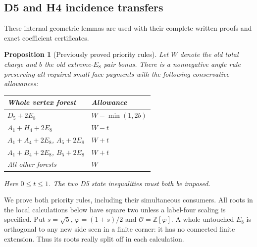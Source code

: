 \documentclass[11pt]{article}
\newtheorem{proposition}[theorem]{Proposition}
\begin{document}
\subsection{D5 and H4 incidence transfers}
These internal geometric lemmas are used with their complete written
proofs and exact coefficient certificates.
\begin{proposition}[Previously proved priority rules]\label{prop:priority}
Let $W$ denote the old total charge and $b$ the old extreme-$E_8$ pair
bonus. There is a nonnegative angle rule preserving all required
small-face payments with the following conservative allowances:
\begin{center}
\begin{tabular}{ll}\toprule
Whole vertex forest&Allowance\\\midrule
$D_5+2E_8$&$W-\min(1,2b)$\\
$A_1+H_4+2E_8$&$W-t$\\
$A_1+A_4+2E_8$, $A_5+2E_8$&$W+t$\\
$A_1+B_4+2E_8$, $B_5+2E_8$&$W+t$\\
All other forests&$W$\\\bottomrule
\end{tabular}
\end{center}
Here $0\le t\le1$. The two D5 state inequalities must both be imposed.
\end{proposition}
We prove both priority rules, including their simultaneous consumers.
All roots in the local calculations below have square two unless a
label-four scaling is specified. Put $s=\sqrt5$, $\varphi=(1+s)/2$
and $\mathcal O=\mathbb Z[\varphi]$. A whole untouched $E_8$ is
orthogonal to any new side seen in a finite corner: it has no connected
finite extension. Thus its roots really split off in each calculation.
\end{document}
